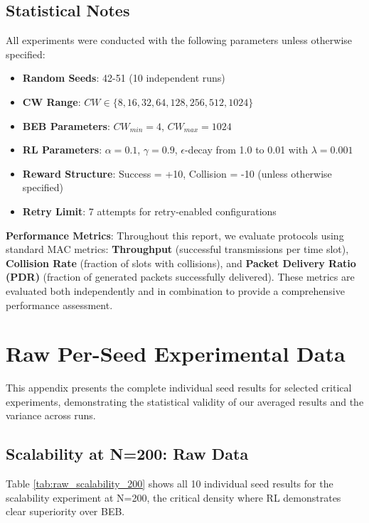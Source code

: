 \documentclass[12pt,a4paper,oneside]{article}
\theoremstyle{definition}
\begin{document}
\subsection{Statistical Notes}

All experiments were conducted with the following parameters unless otherwise specified:
\begin{itemize}
    \item \textbf{Random Seeds}: 42-51 (10 independent runs)
    \item \textbf{CW Range}: $CW \in \{8, 16, 32, 64, 128, 256, 512, 1024\}$
    \item \textbf{BEB Parameters}: $CW_{min}=4$, $CW_{max}=1024$
    \item \textbf{RL Parameters}: $\alpha=0.1$, $\gamma=0.9$, $\epsilon$-decay from 1.0 to 0.01 with $\lambda=0.001$
    \item \textbf{Reward Structure}: Success = +10, Collision = -10 (unless otherwise specified)
    \item \textbf{Retry Limit}: 7 attempts for retry-enabled configurations
\end{itemize}

\textbf{Performance Metrics}: Throughout this report, we evaluate protocols using standard MAC metrics: \textbf{Throughput} (successful transmissions per time slot), \textbf{Collision Rate} (fraction of slots with collisions), and \textbf{Packet Delivery Ratio (PDR)} (fraction of generated packets successfully delivered). These metrics are evaluated both independently and in combination to provide a comprehensive performance assessment.

\clearpage
\section{Raw Per-Seed Experimental Data}

This appendix presents the complete individual seed results for selected critical experiments, demonstrating the statistical validity of our averaged results and the variance across runs.

\subsection{Scalability at N=200: Raw Data}

Table \ref{tab:raw_scalability_200} shows all 10 individual seed results for the scalability experiment at N=200, the critical density where RL demonstrates clear superiority over BEB.
\end{document}
